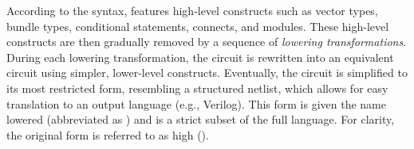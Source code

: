 According to the syntax, {\firrtl} features high-level constructs such as vector types, bundle types, conditional statements, connects, and modules.
These high-level constructs are then gradually removed by a sequence of \emph{lowering transformations}. During each lowering transformation, the circuit is rewritten into an equivalent circuit using simpler, lower-level
constructs. Eventually, the circuit is simplified to its most restricted form, resembling a structured netlist,
which allows for easy translation to an output language (e.g., Verilog).
This form is given the name lowered {\firrtl}  (abbreviated as \lofirrtl) and is a strict subset of the full {\firrtl} language.
For clarity, the original form is referred to as high {\firrtl}  (\hifirrtl).


